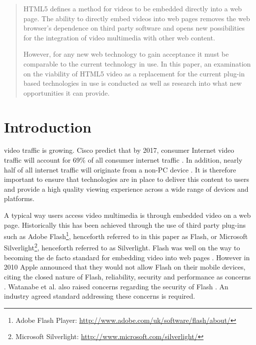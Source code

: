 \documentclass[journal]{IEEEtran}
\begin{document}







\maketitle


\begin{abstract}
HTML5 defines a method for videos to be embedded directly into a web page. The ability to directly embed videos into web pages removes the web browser's dependence on third party software and opens new possibilities for the integration of video multimedia with other web content.

However, for any new web technology to gain acceptance it must be comparable to the current technology in use. In this paper, an examination on the viability of HTML5 video as a replacement for the current plug-in based technologies in use is conducted as well as research into what new opportunities it can provide.
\end{abstract}

\IEEEpeerreviewmaketitle

\section{Introduction}
 video traffic is growing. Cisco predict that by 2017, consumer Internet video traffic will account for 69\% of all consumer internet traffic \cite{website:ciscoForecastAndMethodology}. In addition, nearly half of all internet traffic will originate from a non-PC device \cite{website:ciscoForecastAndMethodology}. It is therefore important to ensure that technologies are in place to deliver this content to users and provide a high quality viewing experience across a wide range of devices and platforms.

A typical way users access video multimedia is through embedded video on a web page. Historically this has been achieved through the use of third party plug-ins such as Adobe Flash\footnote{Adobe Flash Player: \url{http://www.adobe.com/uk/software/flash/about/}}, henceforth referred to in this paper as Flash, or Microsoft Silverlight\footnote{Microsoft Silverlight: \url{http://www.microsoft.com/silverlight/}}, henceforth referred to as Silverlight. Flash was well on the way to becoming the de facto standard for embedding video into web pages \cite{article:HTML5LeadsAWebRevolution}. However in 2010 Apple announced that they would not allow Flash on their mobile devices, citing the closed nature of Flash, reliability, security and performance as concerns \cite{website:appleFlash}. Watanabe et al. also raised concerns regarding the security of Flash \cite{inproceedings:flashSecurity}. An industry agreed standard addressing these concerns is required.
\end{document}
